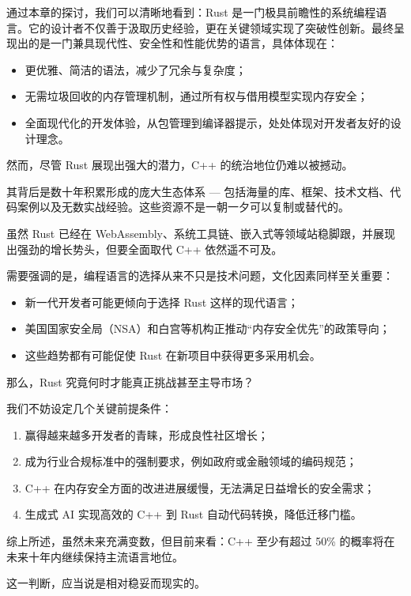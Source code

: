 通过本章的探讨，我们可以清晰地看到：Rust 是一门极具前瞻性的系统编程语言。它的设计者不仅善于汲取历史经验，更在关键领域实现了突破性创新。最终呈现出的是一门兼具现代性、安全性和性能优势的语言，具体体现在：

\begin{itemize}
\item 
更优雅、简洁的语法，减少了冗余与复杂度；

\item
无需垃圾回收的内存管理机制，通过所有权与借用模型实现内存安全；

\item 
全面现代化的开发体验，从包管理到编译器提示，处处体现对开发者友好的设计理念。
\end{itemize}

然而，尽管 Rust 展现出强大的潜力，C++ 的统治地位仍难以被撼动。

其背后是数十年积累形成的庞大生态体系 --- 包括海量的库、框架、技术文档、代码案例以及无数实战经验。这些资源不是一朝一夕可以复制或替代的。

虽然 Rust 已经在 WebAssembly、系统工具链、嵌入式等领域站稳脚跟，并展现出强劲的增长势头，但要全面取代 C++ 依然遥不可及。

需要强调的是，编程语言的选择从来不只是技术问题，文化因素同样至关重要：

\begin{itemize}
\item 
新一代开发者可能更倾向于选择 Rust 这样的现代语言；

\item 
美国国家安全局（NSA）和白宫等机构正推动“内存安全优先”的政策导向；

\item 
这些趋势都有可能促使 Rust 在新项目中获得更多采用机会。
\end{itemize}

那么，Rust 究竟何时才能真正挑战甚至主导市场？

我们不妨设定几个关键前提条件：

\begin{enumerate}
\item 
赢得越来越多开发者的青睐，形成良性社区增长；

\item 
成为行业合规标准中的强制要求，例如政府或金融领域的编码规范；

\item 
C++ 在内存安全方面的改进进展缓慢，无法满足日益增长的安全需求；

\item 
生成式 AI 实现高效的 C++ 到 Rust 自动代码转换，降低迁移门槛。
\end{enumerate}

综上所述，虽然未来充满变数，但目前来看：C++ 至少有超过 50\% 的概率将在未来十年内继续保持主流语言地位。

这一判断，应当说是相对稳妥而现实的。

